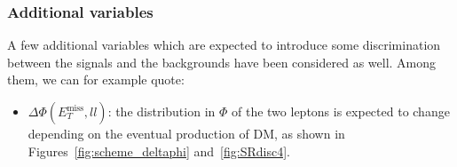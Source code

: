 \documentclass[a4paper, 10pt, openright]{report}
\begin{document}
\subsubsection*{Additional variables}

A few additional variables which are expected to introduce some discrimination between the signals and the backgrounds have been considered as well. Among them, we can for example quote:
\begin{itemize}
\item $\Delta \Phi(E_{T}^{\text{miss}}, ll)$: the distribution in $\Phi$ of the two leptons is expected to change depending on the eventual production of \ac{DM}, as shown in Figures~\ref{fig:scheme_deltaphi} and~\ref{fig:SRdisc4}. 

\begin{figure}[htbp]
\centering
\begin{minipage}[c]{.32\linewidth}
   \end{minipage} \hfill
   \begin{minipage}[c]{.32\linewidth}
   \end{minipage} \hfill
   \begin{minipage}[c]{.32\linewidth}
\end{minipage}
\end{figure}
\end{itemize}
\end{document}
